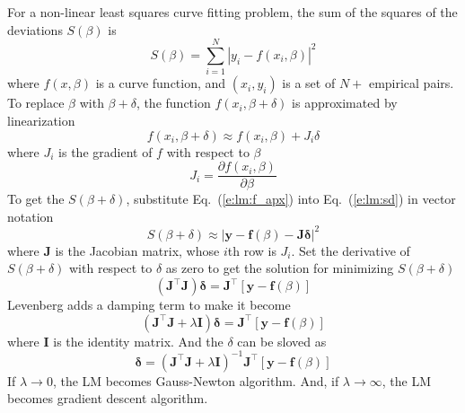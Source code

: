 For a non-linear least squares curve fitting problem, the sum of the squares of the deviations $S(\beta)$ is
\begin{equation}
    \label{e:lm:sd}
    S(\beta) = \sum_{i=1}^N \left| y_i - f(x_i, \beta) \right|^2
\end{equation}
where $f(x, \beta)$ is a curve function, and $(x_i, y_i)$ is a set of $N+$ empirical pairs. To replace $\beta$ with
$\beta + \delta$, the function $f(x_i, \beta + \delta)$ is approximated by linearization
\begin{equation}
    f(x_i, \beta + \delta) \approx f(x_i, \beta) + J_i \delta
    \label{e:lm:f_apx}
\end{equation}
where $J_i$ is the gradient of $f$ with respect to $\beta$
\begin{equation*}
    J_i = \frac{\partial f(x_i, \beta)}{\partial \beta}
\end{equation*}
To get the $S(\beta + \delta)$, substitute Eq.~(\ref{e:lm:f_apx}) into Eq.~(\ref{e:lm:sd}) in vector notation
\begin{equation*}
    S(\beta + \delta) \approx \left| \mathbf{y} - \mathbf{f}(\beta) - \mathbf{J} \mathbf{\delta} \right|^2
\end{equation*}
where $\mathbf{J}$ is the Jacobian matrix, whose $i$th row is $J_i$. Set the derivative of $S(\beta + \delta)$ with
respect to $\delta$ as zero to get the solution for minimizing $S(\beta + \delta)$
\begin{equation*}
    \left( \mathbf{J}^\top \mathbf{J} \right) \mathbf{\delta} = \mathbf{J}^\top \left[ \mathbf{y} - \mathbf{f}(\beta) \right]
\end{equation*}
Levenberg adds a damping term to make it become
\begin{equation*}
    \left( \mathbf{J}^\top \mathbf{J} + \lambda \mathbf{I} \right) \mathbf{\delta} =
    \mathbf{J}^\top \left[ \mathbf{y} - \mathbf{f}(\beta) \right]
\end{equation*}
where $\mathbf{I}$ is the identity matrix. And the $\delta$ can be sloved as
\begin{equation}
    \mathbf{\delta} = \left( \mathbf{J}^\top \mathbf{J} + \lambda \mathbf{I} \right)^{-1}
    \mathbf{J}^\top \left[ \mathbf{y} - \mathbf{f}(\beta) \right]
    \label{e:lm:sol}
\end{equation}
If $\lambda \rightarrow 0$, the LM becomes Gauss-Newton algorithm. And, if $\lambda \rightarrow \infty$, the LM becomes
gradient descent algorithm.

